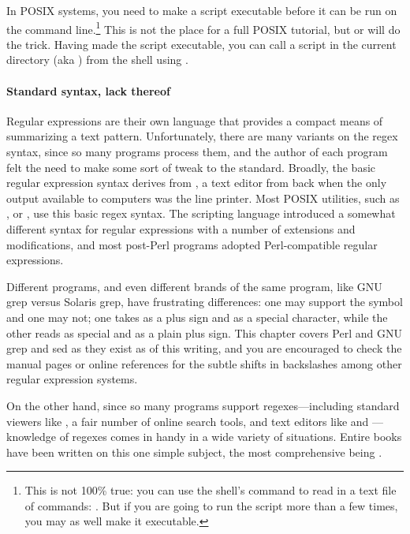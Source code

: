 In POSIX systems, you need to make a script executable before it can be
run on the command line.\footnote{This is not 100\% true: you can use
the shell's  command to read in a text file of commands:
. But if you are going to run the script more than a
few times, you may as well make it executable.} This is not the place
for a full POSIX tutorial, but  or  will do the trick. Having made the script executable, you
can call a script in the current directory (aka ) from the shell
using .

\paragraph{Standard syntax, lack thereof}
Regular expressions are their own language that provides a compact means
of summarizing a text pattern. Unfortunately, there are many variants on the
regex syntax, since so many programs process them, and the author of
each program felt the need to make some sort of tweak to the standard.
Broadly, the basic regular expression syntax derives from , a
text editor from back when the only output available to computers was
the line printer. Most POSIX utilities, such as , 
 or , use this basic regex syntax. The scripting language
 introduced a somewhat different syntax for regular
expressions with a number of extensions and modifications, and most
post-Perl programs adopted Perl-compatible regular expressions. 

Different programs, and even different brands of the same
program, like GNU grep versus Solaris grep, have frustrating
differences: one may support the  symbol and one may not; 
one takes \ci{+} as a plus sign and  \ci{\textbs+} as a special
character, while the other reads \ci{+} as special and \ci{\textbs+}
as a plain plus sign. This chapter covers Perl and GNU grep and sed as they exist as
of this writing, and you are encouraged to check the manual pages or
online references for the subtle shifts in backslashes among other
regular expression systems.

On the other hand, since so many programs support regexes---including
standard viewers like , a fair number of online search tools,
and text editors like  and ---knowledge of regexes comes in
handy in a wide variety of situations. Entire books have been written on
this one simple subject, the most comprehensive being
\citet{friedl:regex}.

